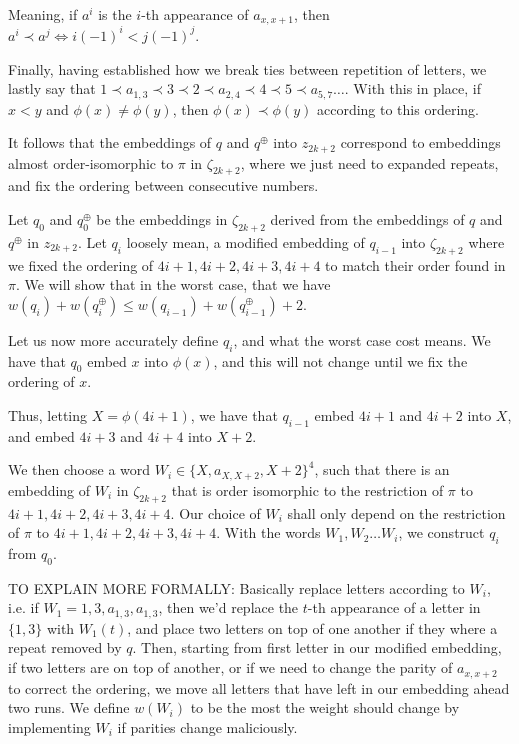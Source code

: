 \documentclass{article}
\begin{document}
Meaning, if $a^i$ is the $i$-th appearance of $a_{x,x+1}$, then $a^i \prec a^j \iff i(-1)^i < j(-1)^j$.

Finally, having established how we break ties between repetition of letters, we lastly say that $1\prec a_{1,3} \prec 3 \prec 2 \prec a_{2,4} \prec 4 \prec 5 \prec a_{5,7} \dots$. With this in place, if $x< y$ and $\phi(x) \neq \phi(y)$, then $\phi(x) \prec \phi(y)$ according to this ordering.

It follows that the embeddings of $q$ and $q^\oplus$ into $z_{2k+2}$ correspond to embeddings almost order-isomorphic to $\pi$ in $\zeta_{2k+2}$, where we just need to expanded repeats, and fix the ordering between consecutive numbers.

Let $q_0$ and $q^\oplus_0$ be the embeddings in $\zeta_{2k+2}$ derived from the embeddings of $q$ and $q^\oplus$ in $z_{2k+2}$. Let $q_i$ loosely mean, a modified embedding of $q_{i-1}$ into $\zeta_{2k+2}$ where we fixed the ordering of $4i+1,4i+2,4i+3,4i+4$ to match their order found in $\pi$. We will show that in the worst case, that we have  $w(q_i)+w(q_i^\oplus) \leq w(q_{i-1})+w(q_{i-1}^\oplus)+2$. 

Let us now more accurately define $q_i$, and what the worst case cost means. We have that $q_0$ embed $x$ into $\phi(x)$, and this will not change until we fix the ordering of $x$. 

Thus, letting $X = \phi(4i+1)$, we have that $q_{i-1}$ embed $4i+1$ and $4i+2$ into $X$, and embed $4i+3$ and $4i+4$ into $X+2$.

We then choose a word $W_i \in \{X,a_{X,X+2},X+2\}^4$, such that there is an embedding of $W_i$ in $\zeta_{2k+2}$ that is order isomorphic to the restriction of $\pi$ to $4i+1,4i+2,4i+3,4i+4$. Our choice of $W_i$ shall only depend on the restriction of $\pi$ to $4i+1,4i+2,4i+3,4i+4$. With the words $W_1,W_2\dots W_i$, we construct $q_i$ from $q_0$.

TO EXPLAIN MORE FORMALLY: Basically replace letters according to $W_i$, i.e. if $W_1 = 1, 3, a_{1,3}, a_{1,3}$, then we'd replace the $t$-th appearance of a letter in $\{1,3\}$ with $W_1(t)$, and place two letters on top of one another if they where a repeat removed by $q$. Then, starting from first letter in our modified embedding, if two letters are on top of another, or if we need to change the parity of $a_{x,x+2}$ to correct the ordering, we move all letters that have left in our embedding ahead two runs. We define $w(W_i)$ to be the most the weight should change by implementing $W_i$ if parities change maliciously.
\end{document}
